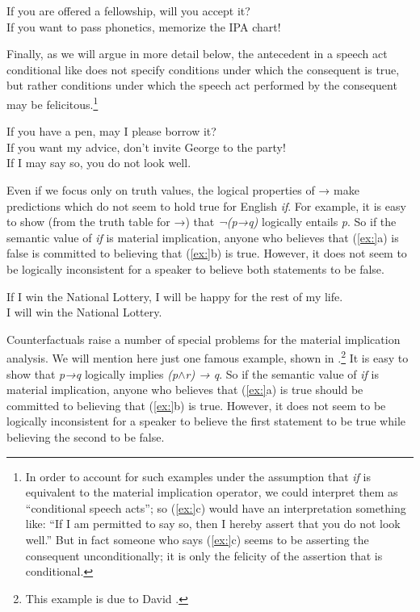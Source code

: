 \ea
\ea If you are offered a fellowship, will you accept it?\\
\ex If you want to pass phonetics, memorize the IPA chart!
                       \z
\z


Finally, as we will argue in more detail below, the antecedent in a speech act conditional like  does not specify conditions under which the consequent is true, but rather conditions under which the speech act performed by the consequent may be felicitous.\footnote{In order to account for such examples under the assumption that \textit{if} is equivalent to the material implication operator, we could interpret them as “conditional speech acts”; so (\ref{ex:}c) would have an interpretation something like: “If I am permitted to say so, then I hereby assert that you do not look well.” But in fact someone who says (\ref{ex:}c) seems to be asserting the consequent unconditionally; it is only the felicity of the assertion that is conditional.}


\ea
\ea If you have a pen, may I please borrow it?\\
\ex If you want my advice, don’t invite George to the party!\\
\ex If I may say so, you do not look well.
                       \z
\z


Even if we focus only on truth values, the logical properties of → make predictions which do not seem to hold true for English \textit{if}. For example, it is easy to show (from the truth table for →) that \textit{¬(p→q)} logically entails \textit{p}. So if the semantic value of \textit{if} is material implication, anyone who believes that (\ref{ex:}a) is false is committed to believing that (\ref{ex:}b) is true. However, it does not seem to be logically inconsistent for a speaker to believe both statements to be false.


\ea
\ea If I win the National Lottery, I will be happy for the rest of my life.\\
\ex I will win the National Lottery.
                       \z
\z


Counterfactuals raise a number of special problems for the material implication analysis. We will mention here just one famous example, shown in .\footnote{This example is due to David \citet{Lewis1973a}.} It is easy to show that \textit{p→q} logically implies \textit{(p}$\wedge$\textit{r) → q}. So if the semantic value of \textit{if} is material implication, anyone who believes that (\ref{ex:}a) is true should be committed to believing that (\ref{ex:}b) is true. However, it does not seem to be logically inconsistent for a speaker to believe the first statement to be true while believing the second to be false.


